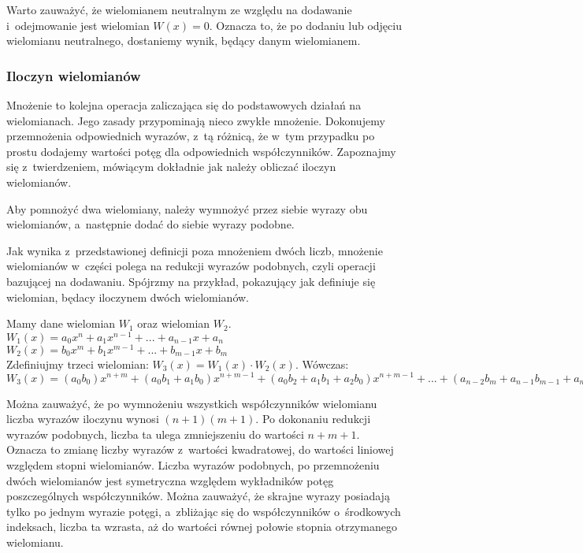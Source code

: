 Warto zauważyć, że wielomianem neutralnym ze względu na dodawanie i~odejmowanie jest wielomian $W(x)=0$. Oznacza to, że po dodaniu lub odjęciu wielomianu neutralnego, dostaniemy wynik, będący danym wielomianem.

\subsubsection{Iloczyn wielomianów}

Mnożenie to kolejna operacja zaliczająca się do podstawowych działań na wielomianach. Jego zasady przypominają nieco zwykłe mnożenie. Dokonujemy przemnożenia odpowiednich wyrazów, z~tą różnicą, że w~tym przypadku po prostu dodajemy wartości potęg dla odpowiednich współczynników. Zapoznajmy się z~twierdzeniem, mówiącym dokładnie jak należy obliczać iloczyn wielomianów.

\begin{theorem}
	$ $\\
	Aby pomnożyć dwa wielomiany, należy wymnożyć przez siebie wyrazy obu wielomianów, a~następnie dodać do siebie wyrazy podobne.
\end{theorem}

Jak wynika z~przedstawionej definicji poza mnożeniem dwóch liczb, mnożenie wielomianów w~części polega na redukcji wyrazów podobnych, czyli operacji bazującej na dodawaniu. Spójrzmy na przykład, pokazujący jak definiuje się wielomian, będacy iloczynem dwóch wielomianów.

\begin{example}
	$ $\\
	Mamy dane wielomian $W_1$ oraz wielomian $W_2$. \\
	$W_1(x) = a_0x^n + a_1x^{n-1} + ... + a_{n-1}x + a_n$ \\
	$W_2(x) = b_0x^m + b_1x^{m-1} + ... + b_{m-1}x + b_m$ \\
	Zdefiniujmy trzeci wielomian: $W_3(x) = W_1(x) \cdot W_2(x)$. Wówczas: \\
	$W_3(x) = (a_0b_0)x^{n+m} + (a_0b_1+a_1b_0)x^{n+m-1} + (a_0b_2+a_1b_1+a_2b_0)x^{n+m-1} + ... + (a_{n-2}b_m+a_{n-1}b_{m-1}+a_nb_{m-2})x^2 + (a_{n-1}b_m + a_nb_{m-1})x + a_nb_m$
\end{example}

Można zauważyć, że po wymnożeniu wszystkich współczynników wielomianu liczba wyrazów iloczynu wynosi $(n+1)(m+1)$. Po dokonaniu redukcji wyrazów podobnych, liczba ta ulega zmniejszeniu do wartości $n+m+1$. Oznacza to zmianę liczby wyrazów z~wartości kwadratowej, do wartości liniowej względem stopni wielomianów. Liczba wyrazów podobnych, po przemnożeniu dwóch wielomianów jest symetryczna względem wykładników potęg poszczególnych współczynników. Można zauważyć, że skrajne wyrazy posiadają tylko po jednym wyrazie potęgi, a~zbliżając się do współczynników o~środkowych indeksach, liczba ta wzrasta, aż do wartości równej połowie stopnia otrzymanego wielomianu.

